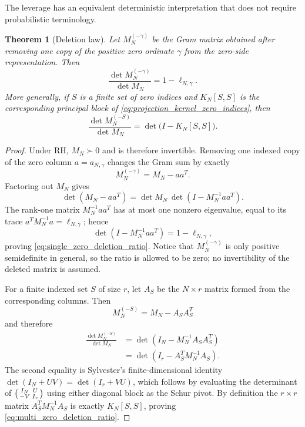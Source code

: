 \documentclass[11pt]{amsart}
\numberwithin{equation}{section}
\theoremstyle{plain}
\newtheorem{theorem}{Theorem}[section]
\theoremstyle{definition}
\theoremstyle{remark}
\newcommand{\RH}{\mathrm{RH}}
\begin{document}
The leverage has an equivalent deterministic interpretation that does not require probabilistic terminology.

\begin{theorem}[Deletion law]
\label{thm:zero_deletion_law}
Let $M_N^{(-\gamma)}$ be the Gram matrix obtained after removing one copy of the positive zero ordinate $\gamma$ from the zero-side representation.  Then
\begin{equation}
\boxed{
\frac{\det M_N^{(-\gamma)}}{\det M_N}=1-\ell_{N,\gamma}.}
\label{eq:single_zero_deletion_ratio}
\end{equation}
More generally, if $S$ is a finite set of zero indices and $K_N[S,S]$ is the corresponding principal block of \eqref{eq:projection_kernel_zero_indices}, then
\begin{equation}
\frac{\det M_N^{(-S)}}{\det M_N}
=\det\bigl(I-K_N[S,S]\bigr).
\label{eq:multi_zero_deletion_ratio}
\end{equation}
\end{theorem}

\begin{proof}
Under $\RH$, $M_N\succ0$ and is therefore invertible.  Removing one indexed copy of the zero column $a=a_{N,\gamma}$ changes the Gram sum by exactly
\begin{equation}
M_N^{(-\gamma)}=M_N-aa^T.
\end{equation}
Factoring out $M_N$ gives
\begin{equation}
\det(M_N-aa^T)=\det M_N\,\det(I-M_N^{-1}aa^T).
\end{equation}
The rank-one matrix $M_N^{-1}aa^T$ has at most one nonzero eigenvalue, equal to its trace $a^TM_N^{-1}a=\ell_{N,\gamma}$; hence
\begin{equation}
\det(I-M_N^{-1}aa^T)=1-\ell_{N,\gamma},
\end{equation}
proving \eqref{eq:single_zero_deletion_ratio}.  Notice that $M_N^{(-\gamma)}$ is only positive semidefinite in general, so the ratio is allowed to be zero; no invertibility of the deleted matrix is assumed.

For a finite indexed set $S$ of size $r$, let $A_S$ be the $N\times r$ matrix formed from the corresponding columns.  Then
\begin{equation}
M_N^{(-S)}=M_N-A_SA_S^T
\end{equation}
and therefore
\begin{align}
\frac{\det M_N^{(-S)}}{\det M_N}
&=\det(I_N-M_N^{-1}A_SA_S^T)\\
&=\det(I_r-A_S^TM_N^{-1}A_S).
\end{align}
The second equality is Sylvester's finite-dimensional identity $\det(I_N+UV)=\det(I_r+VU)$, which follows by evaluating the determinant of
$\begin{psmallmatrix}I_N&U\\-V&I_r\end{psmallmatrix}$ using either diagonal block as the Schur pivot.  By definition the $r\times r$ matrix $A_S^TM_N^{-1}A_S$ is exactly $K_N[S,S]$, proving \eqref{eq:multi_zero_deletion_ratio}.
\end{proof}
\end{document}
